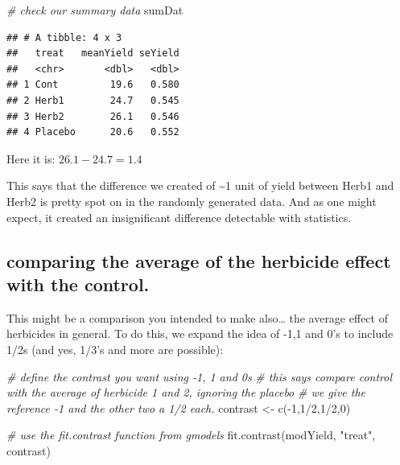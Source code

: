 \documentclass[
]{book}
\newenvironment{Shaded}{\begin{snugshade}}{\end{snugshade}}
\newcommand{\CommentTok}[1]{\textcolor[rgb]{0.56,0.35,0.01}{\textit{#1}}}
\newcommand{\DecValTok}[1]{\textcolor[rgb]{0.00,0.00,0.81}{#1}}
\newcommand{\FunctionTok}[1]{\textcolor[rgb]{0.00,0.00,0.00}{#1}}
\newcommand{\NormalTok}[1]{#1}
\newcommand{\OtherTok}[1]{\textcolor[rgb]{0.56,0.35,0.01}{#1}}
\newcommand{\SpecialCharTok}[1]{\textcolor[rgb]{0.00,0.00,0.00}{#1}}
\newcommand{\StringTok}[1]{\textcolor[rgb]{0.31,0.60,0.02}{#1}}
\begin{document}
\begin{Shaded}
\begin{Highlighting}[]
\CommentTok{\# check our summary data}
\NormalTok{sumDat}
\end{Highlighting}
\end{Shaded}

\begin{verbatim}
## # A tibble: 4 x 3
##   treat   meanYield seYield
##   <chr>       <dbl>   <dbl>
## 1 Cont         19.6   0.580
## 2 Herb1        24.7   0.545
## 3 Herb2        26.1   0.546
## 4 Placebo      20.6   0.552
\end{verbatim}

Here it is: \(26.1 - 24.7 = 1.4\)

This says that the difference we created of \textasciitilde1 unit of yield between Herb1 and Herb2 is pretty spot on in the randomly generated data. And as one might expect, it created an insignificant difference detectable with statistics.

\hypertarget{comparing-the-average-of-the-herbicide-effect-with-the-control.}{%
\subsection{comparing the average of the herbicide effect with the control.}\label{comparing-the-average-of-the-herbicide-effect-with-the-control.}}

This might be a comparison you intended to make also\ldots{} the average effect of herbicides in general. To do this, we expand the idea of -1,1 and 0's to include 1/2s (and yes, 1/3's and more are possible):

\begin{Shaded}
\begin{Highlighting}[]
\CommentTok{\# define the contrast you want using {-}1, 1 and 0\textquotesingle{}s}
\CommentTok{\# this says compare control with the average of herbicide 1 and 2, ignoring the placebo}
\CommentTok{\# we give the reference {-}1 and the \textquotesingle{}other two\textquotesingle{} a 1/2 each.}
\NormalTok{contrast }\OtherTok{\textless{}{-}} \FunctionTok{c}\NormalTok{(}\SpecialCharTok{{-}}\DecValTok{1}\NormalTok{,}\DecValTok{1}\SpecialCharTok{/}\DecValTok{2}\NormalTok{,}\DecValTok{1}\SpecialCharTok{/}\DecValTok{2}\NormalTok{,}\DecValTok{0}\NormalTok{)}

\CommentTok{\# use the fit.contrast function from gmodels}
\FunctionTok{fit.contrast}\NormalTok{(modYield, }\StringTok{"treat"}\NormalTok{, contrast)}
\end{Highlighting}
\end{Shaded}
\end{document}
